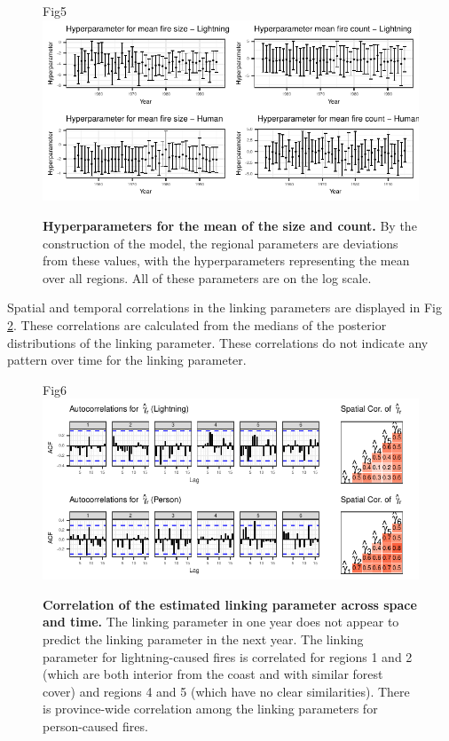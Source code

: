\documentclass[10pt,letterpaper]{article}
\begin{document}
\begin{figure}[h!]
\centering
Fig5
\includegraphics[width=\textwidth]{Joint_Count_Files/hypers-1.pdf}
\caption{\label{hypers}\textbf{Hyperparameters for the mean of the size and
count.} By the construction of the model, the regional parameters are
deviations from these values, with the hyperparameters representing the
mean over all regions. All of these parameters are on the log scale.}
\end{figure}

Spatial and temporal correlations in the linking parameters are
displayed in Fig \ref{spatialcor}. These correlations are calculated
from the medians of the posterior distributions of the linking parameter. These correlations do not indicate any
pattern over time for the linking parameter.

\begin{figure}[h!]
\centering
Fig6
\includegraphics[width=\textwidth]{Joint_Count_Files/spatialcor-1.pdf}
\caption{\label{spatialcor}\textbf{Correlation of the estimated linking
parameter across space and time.} The linking parameter in one year does
not appear to predict the linking parameter in the next year. The
linking parameter for lightning-caused fires is correlated for regions 1
and 2 (which are both interior from the coast and with similar forest
cover) and regions 4 and 5 (which have no clear similarities). There is
province-wide correlation among the linking parameters for person-caused
fires.}
\end{figure}
\end{document}
